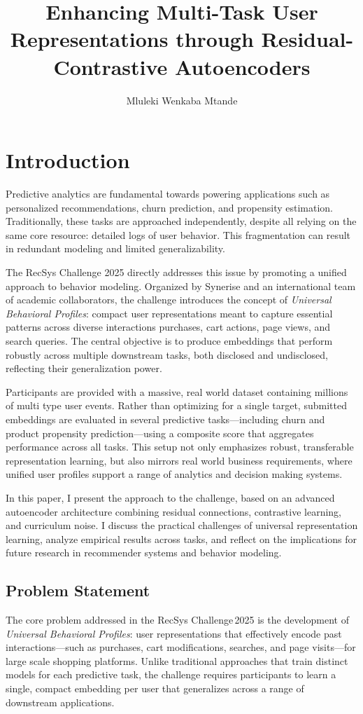 \documentclass[sigconf]{acmart}
\title{Enhancing Multi-Task User Representations through Residual-Contrastive Autoencoders}
\author{Mluleki Wenkaba Mtande}
\affiliation{
  \institution{Independent Researcher}
  \city{Taichung}
  \country{Taiwan}
}
\begin{document}
\maketitle

\section{Introduction}
Predictive analytics are fundamental towards powering applications such as personalized recommendations, churn prediction, and propensity estimation. Traditionally, these tasks are approached independently, despite all relying on the same core resource: detailed logs of user behavior. This fragmentation can result in redundant modeling and limited generalizability.

The RecSys Challenge 2025 \cite{recsys2025} directly addresses this issue by promoting a unified approach to behavior modeling. Organized by Synerise and an international team of academic collaborators, the challenge introduces the concept of \emph{Universal Behavioral Profiles}: compact user representations meant to capture essential patterns across diverse interactions purchases, cart actions, page views, and search queries. The central objective is to produce embeddings that perform robustly across multiple downstream tasks, both disclosed and undisclosed, reflecting their generalization power.

Participants are provided with a massive, real world dataset containing millions of multi type user events. Rather than optimizing for a single target, submitted embeddings are evaluated in several predictive tasks—including churn and product propensity prediction—using a composite score that aggregates performance across all tasks. This setup not only emphasizes robust, transferable representation learning, but also mirrors real world business requirements, where unified user profiles support a range of analytics and decision making systems.

In this paper, I present the approach to the challenge, based on an advanced autoencoder architecture combining residual connections, contrastive learning, and curriculum noise. I discuss the practical challenges of universal representation learning, analyze empirical results across tasks, and reflect on the implications for future research in recommender systems and behavior modeling.

\subsection{Problem Statement}
The core problem addressed in the RecSys Challenge 2025 is the development of \emph{Universal Behavioral Profiles}: user representations that effectively encode past interactions—such as purchases, cart modifications, searches, and page visits—for large scale shopping platforms. Unlike traditional approaches that train distinct models for each predictive task, the challenge requires participants to learn a single, compact embedding per user that generalizes across a range of downstream applications.
\end{document}
